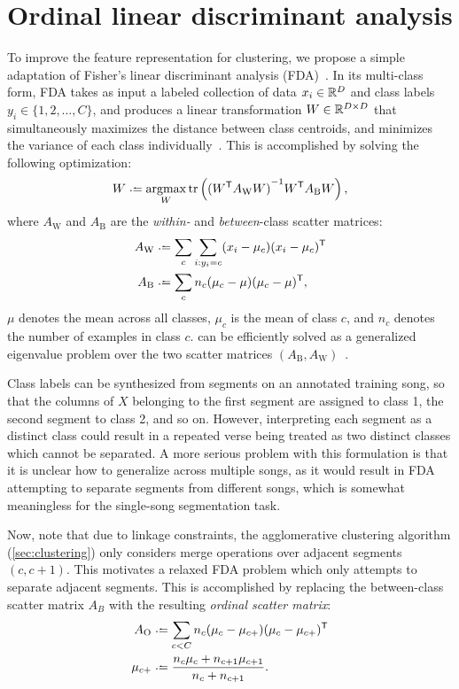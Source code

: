 \documentclass{article}
\begin{document}
\section{Ordinal linear discriminant analysis}


\label{sec:olda}
To improve the feature representation for clustering, we propose a simple adaptation of Fisher's linear discriminant
analysis (FDA)~\cite{fisher1936use}.  In its multi-class form, FDA takes as input a labeled collection of data $x_i \in \mathbb{R}^D$
and class labels $y_i \in \{1,2,\ldots, C\}$, and produces a linear transformation $W \in \mathbb{R}^{D\times D}$ that simultaneously 
maximizes the distance between class centroids, and minimizes the variance of each class 
individually~\cite{fukunaga1990introduction}. This is accomplished by solving the following optimization:
\begin{equation}
W \defeq \argmax_W \trace\left( {(W\trans A_\text{W} W)}^{-1} W\trans A_\text{B} W \right) \label{eq:fda},
\end{equation}
where $A_\text{W}$ and $A_\text{B}$ are the \emph{within-} and \emph{between}-class scatter matrices:
\begin{align*}
A_\text{W} & \defeq \sum_c \sum_{i : y_i = c} (x_i - \mu_c)(x_i - \mu_c)\trans\\
A_\text{B} & \defeq \sum_c n_c (\mu_c - \mu)(\mu_c - \mu)\trans,
\end{align*}
$\mu$ denotes the mean across all classes, $\mu_c$ is the mean of class $c$, and $n_c$ denotes the number of examples in class $c$.
 can be efficiently solved as a generalized eigenvalue problem over the two scatter matrices $(A_\text{B},
A_\text{W})$~\cite{de2005eigenproblems}.

Class labels can be synthesized from segments on an annotated training song, so that the columns of $X$ belonging to the first 
segment are assigned to class 1, the second segment to class 2, and so on.
However, interpreting each segment as a distinct class could result in a repeated verse being treated as two distinct classes which 
cannot be separated. 
A more serious problem with this formulation is that it is unclear how to generalize across multiple songs, as it would result in
FDA attempting to separate segments from different songs, which is somewhat meaningless for the single-song segmentation task.

Now, note that due to linkage constraints, the agglomerative clustering algorithm (\cref{sec:clustering}) only considers merge 
operations over adjacent segments $(c, c+1)$. This motivates a relaxed FDA problem which only attempts to separate adjacent
segments.  This is accomplished by replacing the between-class scatter matrix $A_B$ with the resulting \emph{ordinal scatter matrix}:
\begin{align*}
A_\text{O} &\defeq \sum_{c < C} n_c (\mu_c - \mu_{c+}) (\mu_c - \mu_{c+})\trans\\
\mu_{c+} &\defeq \frac{n_c \mu_c + n_{c+1} \mu_{c+1} }{n_c + n_{c+1}}.
\end{align*}
\end{document}
